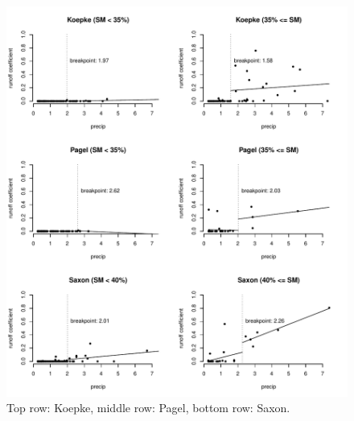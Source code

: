 \documentclass[12pt]{article}
\begin{document}
\begin{figure}
    \begin{center}
\includegraphics{runoff-precip_binned2}
    \end{center}
    \caption{Top row: Koepke, middle row: Pagel, bottom row: Saxon.\label{precip_binned2}}
\end{figure}
\end{document}
